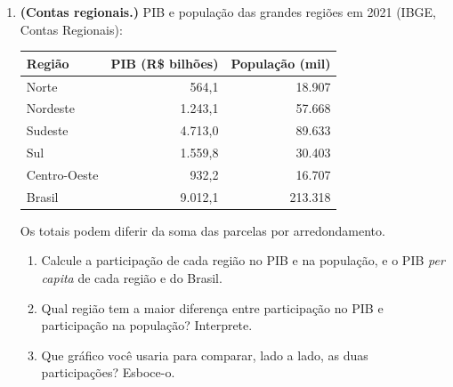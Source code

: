 \documentclass[11pt]{article}
\begin{document}
\begin{enumerate}[label=\textbf{A\arabic*.}, leftmargin=*]
\item \textbf{(Contas regionais.)} PIB e população das grandes regiões em 2021 (IBGE, Contas Regionais):
\begin{center}
\begin{tabular}{lrr}
\toprule
Região & PIB (R\$ bilhões) & População (mil) \\
\midrule
Norte & 564,1 & 18.907 \\
Nordeste & 1.243,1 & 57.668 \\
Sudeste & 4.713,0 & 89.633 \\
Sul & 1.559,8 & 30.403 \\
Centro-Oeste & 932,2 & 16.707 \\
\midrule
Brasil & 9.012,1 & 213.318 \\
\bottomrule
\end{tabular}
\end{center}
{\footnotesize Os totais podem diferir da soma das parcelas por arredondamento.}

\begin{enumerate}[label=(\alph*)]
  \item Calcule a participação de cada região no PIB e na população, e o PIB \emph{per capita} de cada região e do Brasil.
  \item Qual região tem a maior diferença entre participação no PIB e participação na população? Interprete.
  \item Que gráfico você usaria para comparar, lado a lado, as duas participações? Esboce-o.
\end{enumerate}

\end{enumerate}
\end{document}
